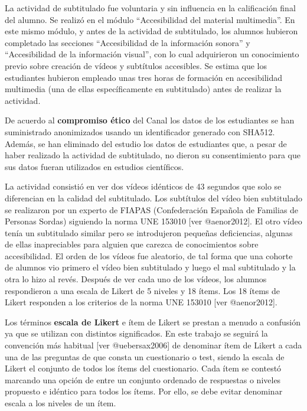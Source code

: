 \documentclass[
  letterpaper,
  DIV=11,
  numbers=noendperiod]{scrartcl}
\begin{document}
La actividad de subtitulado fue voluntaria y sin influencia en la
calificación final del alumno. Se realizó en el módulo ``Accesibilidad
del material multimedia''. En este mismo módulo, y antes de la actividad
de subtitulado, los alumnos hubieron completado las secciones
``Accesibilidad de la información sonora'' y ``Accesibilidad de la
información visual'', con lo cual adquirieron un conocimiento previo
sobre creación de vídeos y subtítulos accesibles. Se estima que los
estudiantes hubieron empleado unas tres horas de formación en
accesibilidad multimedia (una de ellas específicamente en subtitulado)
antes de realizar la actividad.

De acuerdo al \textbf{compromiso ético} del Canal los datos de los
estudiantes se han suministrado anonimizados usando un identificador
generado con SHA512. Además, se han eliminado del estudio los datos de
estudiantes que, a pesar de haber realizado la actividad de subtitulado,
no dieron su consentimiento para que sus datos fueran utilizados en
estudios científicos.

La actividad consistió en ver dos vídeos idénticos de 43 segundos que
solo se diferencian en la calidad del subtitulado. Los subtítulos del
vídeo bien subtitulado se realizaron por un experto de FIAPAS
(Confederación Española de Familias de Personas Sordas) siguiendo la
norma UNE 153010 {[}ver @aenor2012{]}. El otro vídeo tenía un
subtitulado similar pero se introdujeron pequeñas deficiencias, algunas
de ellas inapreciables para alguien que carezca de conocimientos sobre
accesibilidad. El orden de los vídeos fue aleatorio, de tal forma que
una cohorte de alumnos vio primero el vídeo bien subtitulado y luego el
mal subtitulado y la otra lo hizo al revés. Después de ver cada uno de
los vídeos, los alumnos respondieron a una escala de Likert de 5 niveles
y 18 ítems. Los 18 ítems de Likert responden a los criterios de la norma
UNE 153010 {[}ver @aenor2012{]}.

Los términos \textbf{escala de Likert} e ítem de Likert se prestan a
menudo a confusión ya que se utilizan con distintos significados. En
este trabajo se seguirá la convención más habitual {[}ver
@uebersax2006{]} de denominar ítem de Likert a cada una de las preguntas
de que consta un cuestionario o test, siendo la escala de Likert el
conjunto de todos los ítems del cuestionario. Cada ítem se contestó
marcando una opción de entre un conjunto ordenado de respuestas o
niveles propuesto e idéntico para todos los ítems. Por ello, se debe
evitar denominar escala a los niveles de un ítem.
\end{document}
